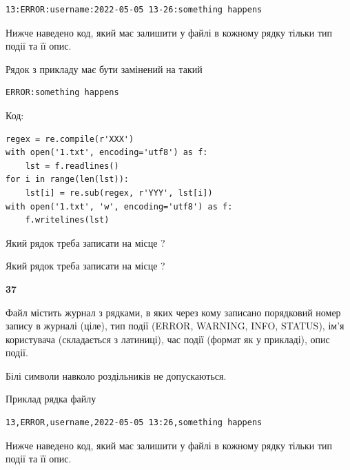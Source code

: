 \begin{verbatim}
13:ERROR:username:2022-05-05 13-26:something happens
\end{verbatim}


Нижче наведено код, який має залишити у файлі в кожному рядку тільки тип події та її опис.

Рядок з прикладу має бути замінений на такий



\begin{verbatim}
ERROR:something happens
\end{verbatim}




Код:



\begin{verbatim}
regex = re.compile(r'XXX')
with open('1.txt', encoding='utf8') as f:
    lst = f.readlines()
for i in range(len(lst)):
    lst[i] = re.sub(regex, r'YYY', lst[i])
with open('1.txt', 'w', encoding='utf8') as f:
    f.writelines(lst)
\end{verbatim}









Який рядок треба записати на місце  ?\par
\vspace{5mm}


Який рядок треба записати на місце  ?\par


\newpage

{\begin {center}\textbf{ 37}\end {center}}\par
Файл  містить журнал з рядками, в яких через кому записано поряд\-ко\-вий номер запису в журналі (ціле), тип події (ERROR, WARNING, INFO, STATUS), ім'я користувача (складається з латиниці), час події (фор\-мат як у прикладі), опис події.

Білі символи навколо роздільників не допускаються.

Приклад рядка файлу



\begin{verbatim}
13,ERROR,username,2022-05-05 13:26,something happens
\end{verbatim}


Нижче наведено код, який має залишити у файлі в кожному рядку тільки тип події та її опис.

